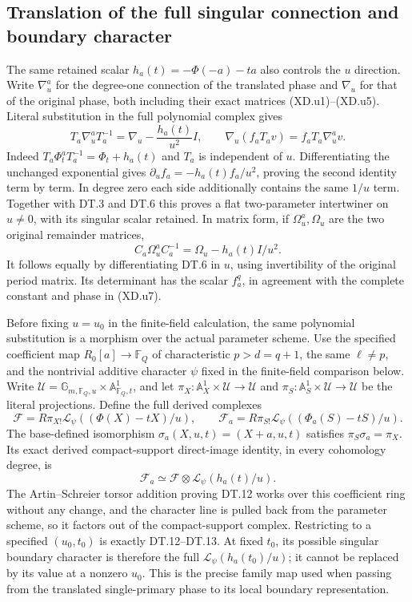 
\subsection{Translation of the full singular connection and boundary character}
The same retained scalar $h_a(t)=-\Phi(-a)-ta$ also controls the
$u$ direction.  Write $\nabla_u^a$ for the degree-one connection
of the translated phase and $\nabla_u$ for that of the original
phase, both including their exact matrices (XD.u1)--(XD.u5).
Literal substitution in the full polynomial complex gives
\[
 T_a\nabla_u^aT_a^{-1}=\nabla_u-\frac{h_a(t)}{u^2}I,
 \qquad\nabla_u(f_aT_av)=f_aT_a\nabla_u^av.          \tag{DT.14}
\]
Indeed $T_a\Phi_t^aT_a^{-1}=\Phi_t+h_a(t)$ and $T_a$ is
independent of $u$.  Differentiating the unchanged exponential
gives $\partial_u f_a=-h_a(t)f_a/u^2$, proving the second identity
term by term.  In degree zero each side additionally contains
the same $1/u$ term.  Together with DT.3 and DT.6 this proves a
flat two-parameter intertwiner on $u\ne0$, with its singular
scalar retained.  In matrix form, if $\Omega_u^a,\Omega_u$ are
the two original remainder matrices,
\[
 C_a\Omega_u^a C_a^{-1}
       =\Omega_u-h_a(t)I/u^2.                        \tag{DT.15}
\]
It follows equally by differentiating DT.6 in $u$, using
invertibility of the original period matrix.  Its determinant
has the scalar $f_a^q$, in agreement with the complete constant
and phase in (XD.u7).

Before fixing $u=u_0$ in the finite-field calculation, the same
polynomial substitution is a morphism over the actual parameter
scheme. Use the specified coefficient map
$R_0[a]\to\mathbb F_Q$ of characteristic $p>d=q+1$, the same
$\ell\ne p$, and the nontrivial additive character $\psi$ fixed
in the finite-field comparison below.  Write
$\mathscr U=\mathbb G_{m,\mathbb F_Q,u}\times
\mathbb A^1_{\mathbb F_Q,t}$, and let
$\pi_X:\mathbb A^1_X\times\mathscr U\to\mathscr U$ and
$\pi_S:\mathbb A^1_S\times\mathscr U\to\mathscr U$ be the
literal projections. Define the full derived complexes
\[
 \mathcal F=R\pi_{X!}\mathcal L_\psi((\Phi(X)-tX)/u),\qquad
 \mathcal F_a=R\pi_{S!}\mathcal L_\psi((\Phi_a(S)-tS)/u).
\]
The base-defined isomorphism $\sigma_a(X,u,t)=(X+a,u,t)$
satisfies $\pi_S\sigma_a=\pi_X$.  Its exact derived
compact-support direct-image identity, in every cohomology degree, is
\[
 \mathcal F_a\simeq\mathcal F\otimes
                    \mathcal L_\psi(h_a(t)/u).        \tag{DT.16}
\]
The Artin--Schreier torsor addition proving DT.12 works over
this coefficient ring without any change, and the character line
is pulled back from the parameter scheme, so it factors out of
the compact-support complex.  Restricting to a specified
$(u_0,t_0)$ is exactly DT.12--DT.13.  At fixed $t_0$, its
possible singular boundary character is therefore the full
$\mathcal L_\psi(h_a(t_0)/u)$; it cannot be replaced by its
value at a nonzero $u_0$.  This is the precise family map used
when passing from the translated single-primary phase to its
local boundary representation.
